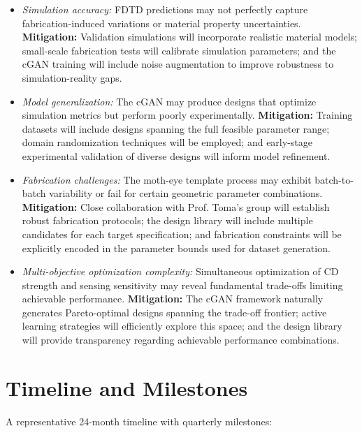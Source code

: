 \documentclass[12pt,a4paper]{article}
\begin{document}
\begin{itemize}
  \item \textit{Simulation accuracy:} FDTD predictions may not perfectly capture fabrication-induced variations or material property uncertainties. \textbf{Mitigation:} Validation simulations will incorporate realistic material models; small-scale fabrication tests will calibrate simulation parameters; and the cGAN training will include noise augmentation to improve robustness to simulation-reality gaps.
  \item \textit{Model generalization:} The cGAN may produce designs that optimize simulation metrics but perform poorly experimentally. \textbf{Mitigation:} Training datasets will include designs spanning the full feasible parameter range; domain randomization techniques will be employed; and early-stage experimental validation of diverse designs will inform model refinement.
  \item \textit{Fabrication challenges:} The moth-eye template process may exhibit batch-to-batch variability or fail for certain geometric parameter combinations. \textbf{Mitigation:} Close collaboration with Prof. Toma's group will establish robust fabrication protocols; the design library will include multiple candidates for each target specification; and fabrication constraints will be explicitly encoded in the parameter bounds used for dataset generation.
  \item \textit{Multi-objective optimization complexity:} Simultaneous optimization of CD strength and sensing sensitivity may reveal fundamental trade-offs limiting achievable performance. \textbf{Mitigation:} The cGAN framework naturally generates Pareto-optimal designs spanning the trade-off frontier; active learning strategies will efficiently explore this space; and the design library will provide transparency regarding achievable performance combinations.
\end{itemize}

\section{Timeline and Milestones}
A representative 24-month timeline with quarterly milestones:
\end{document}
